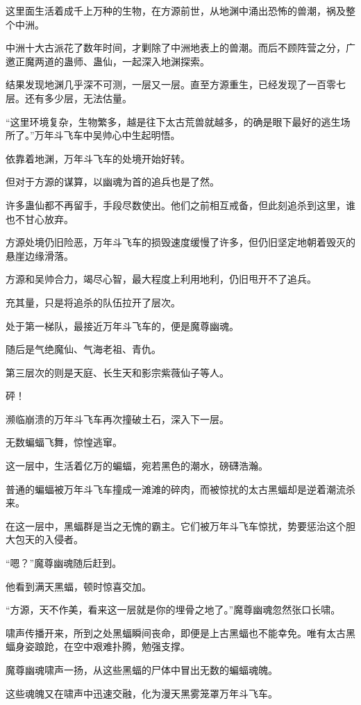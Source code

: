 \begin{this_body}
这里面生活着成千上万种的生物，在方源前世，从地渊中涌出恐怖的兽潮，祸及整个中洲。

中洲十大古派花了数年时间，才剿除了中洲地表上的兽潮。而后不顾阵营之分，广邀正魔两道的蛊师、蛊仙，一起深入地渊探索。

结果发现地渊几乎深不可测，一层又一层。直至方源重生，已经发现了一百零七层。还有多少层，无法估量。

“这里环境复杂，生物繁多，越是往下太古荒兽就越多，的确是眼下最好的逃生场所了。”万年斗飞车中吴帅心中生起明悟。

依靠着地渊，万年斗飞车的处境开始好转。

但对于方源的谋算，以幽魂为首的追兵也是了然。

许多蛊仙都不再留手，手段尽数使出。他们之前相互戒备，但此刻追杀到这里，谁也不甘心放弃。

方源处境仍旧险恶，万年斗飞车的损毁速度缓慢了许多，但仍旧坚定地朝着毁灭的悬崖边缘滑落。

方源和吴帅合力，竭尽心智，最大程度上利用地利，仍旧甩开不了追兵。

充其量，只是将追杀的队伍拉开了层次。

处于第一梯队，最接近万年斗飞车的，便是魔尊幽魂。

随后是气绝魔仙、气海老祖、青仇。

第三层次的则是天庭、长生天和影宗紫薇仙子等人。

砰！

濒临崩溃的万年斗飞车再次撞破土石，深入下一层。

无数蝙蝠飞舞，惊惶逃窜。

这一层中，生活着亿万的蝙蝠，宛若黑色的潮水，磅礴浩瀚。

普通的蝙蝠被万年斗飞车撞成一滩滩的碎肉，而被惊扰的太古黑蝠却是逆着潮流杀来。

在这一层中，黑蝠群是当之无愧的霸主。它们被万年斗飞车惊扰，势要惩治这个胆大包天的入侵者。

“嗯？”魔尊幽魂随后赶到。

他看到满天黑蝠，顿时惊喜交加。

“方源，天不作美，看来这一层就是你的埋骨之地了。”魔尊幽魂忽然张口长啸。

啸声传播开来，所到之处黑蝠瞬间丧命，即便是上古黑蝠也不能幸免。唯有太古黑蝠身姿踉跄，在空中艰难扑腾，勉强支撑。

魔尊幽魂啸声一扬，从这些黑蝠的尸体中冒出无数的蝙蝠魂魄。

这些魂魄又在啸声中迅速交融，化为漫天黑雾笼罩万年斗飞车。


\end{this_body}
